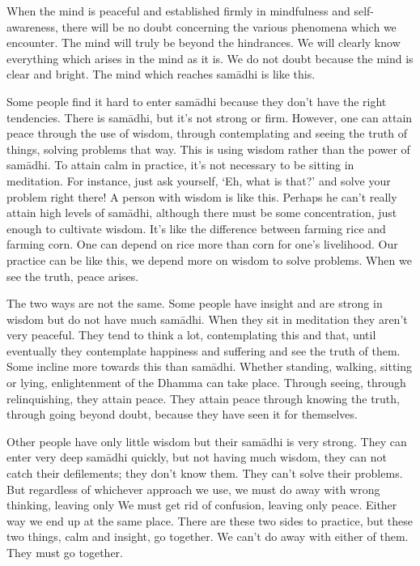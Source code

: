 When the mind is peaceful and established firmly in mindfulness and self-awareness, there will be no doubt concerning the various phenomena which we encounter. The mind will truly be beyond the hindrances. We will clearly know everything which arises in the mind as it is. We do not doubt because the mind is clear and bright. The mind which reaches sam\=adhi is like this.

Some people find it hard to enter sam\=adhi because they don't have the right tendencies. There is sam\=adhi, but it's not strong or firm. However, one can attain peace through the use of wisdom, through contemplating and seeing the truth of things, solving problems that way. This is using wisdom rather than the power of sam\=adhi. To attain calm in practice, it's not necessary to be sitting in meditation. For instance, just ask yourself, `Eh, what is that?' and solve your problem right there! A person with wisdom is like this. Perhaps he can't really attain high levels of sam\=adhi, although there must be some concentration, just enough to cultivate wisdom. It's like the difference between farming rice and farming corn. One can depend on rice more than corn for one's livelihood. Our practice can be like this, we depend more on wisdom to solve problems. When we see the truth, peace arises. 

The two ways are not the same. Some people have insight and are strong in wisdom but do not have much sam\=adhi. When they sit in meditation they aren't very peaceful. They tend to think a lot, contemplating this and that, until eventually they contemplate happiness and suffering and see the truth of them. Some incline more towards this than sam\=adhi. Whether standing, walking, sitting or lying, enlightenment of the Dhamma can take place. Through seeing, through relinquishing, they attain peace. They attain peace through knowing the truth, through going beyond doubt, because they have seen it for themselves. 

Other people have only little wisdom but their sam\=adhi is very strong. They can enter very deep sam\=adhi quickly, but not having much wisdom, they can not catch their defilements; they don't know them. They can't solve their problems. But regardless of whichever approach we use, we must do away with wrong thinking, leaving only  We must get rid of confusion, leaving only peace. Either way we end up at the same place. There are these two sides to practice, but these two things, calm and insight, go together. We can't do away with either of them. They must go together. 

